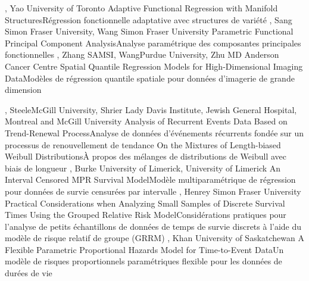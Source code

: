 {
,  {Yao}
{University of Toronto}
}
{Adaptive Functional Regression with Manifold Structures}{Régression fonctionnelle adaptative avec structures de variété}
{\bubbleE \enspace \screenE}
{
,  {Sang}
{Simon Fraser University},  {Wang}
{Simon Fraser University}
}
{Parametric Functional Principal Component Analysis}{Analyse paramétrique des composantes principales fonctionnelles}
{\bubbleE \enspace \screenE}
{
,  {Zhang}
{SAMSI},  {Wang}{Purdue University},  {Zhu}
{MD Anderson Cancer Centre}
}
{Spatial Quantile Regression Models for High-Dimensional Imaging Data}{Modèles de régression quantile spatiale pour données d’imagerie de grande dimension}
{\bubbleE \enspace \screenE}



{
,  {Steele}{McGill University},  {Shrier}
{Lady Davis Institute, Jewish General Hospital, Montreal and McGill University}
}
{Analysis of Recurrent Events Data Based on Trend-Renewal Process}{Analyse de données d’événements récurrents fondée sur un processus de renouvellement de tendance}
{\bubbleE \enspace \screenE}
{
}
{On the Mixtures of Length-biased Weibull Distributions}{À propos des mélanges de distributions de Weibull avec biais de longueur}
{\bubbleE \enspace \screenE}
{
,  {Burke}
{University of Limerick}, 
{University of Limerick}
}
{An Interval Censored MPR Survival Model}{Modèle multiparamétrique de régression pour données de survie censurées par intervalle}
{\bubbleE \enspace \screenE}
{
,  {Henrey}
{Simon Fraser University}
}
{Practical Considerations when Analyzing Small Samples of Discrete Survival Times Using the Grouped Relative Risk Model}{Considérations pratiques pour l’analyse de petits échantillons de données de temps de survie discrets à l’aide du modèle de risque relatif de groupe (GRRM) }
{\bubbleE \enspace \screenE}
{
,  {Khan}
{University of Saskatchewan}
}
{ A Flexible Parametric Proportional Hazards Model for Time-to-Event Data}{Un modèle de risques proportionnels paramétriques flexible pour les données de durées de vie}
{\bubbleE \enspace \screenE}


